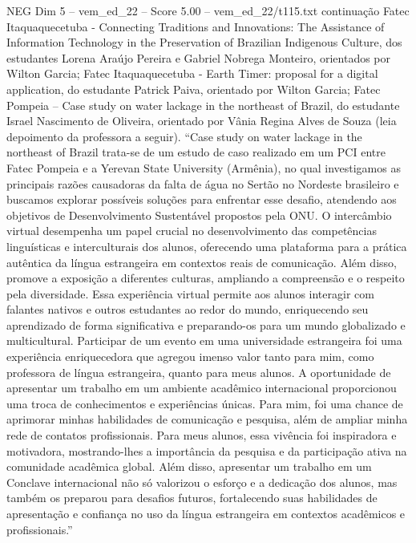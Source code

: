 \begin{textsample}{NEG Dim 5 – vem\_ed\_22 – Score 5.00 – vem\_ed\_22/t115.txt}  \label{ex:f5_neg_086}
continuação Fatec Itaquaquecetuba - Connecting Traditions and Innovations: The Assistance of Information Technology in the Preservation of Brazilian Indigenous Culture, dos estudantes Lorena Araújo Pereira e Gabriel Nobrega Monteiro, orientados por Wilton Garcia; Fatec Itaquaquecetuba - Earth Timer: proposal for a digital application, do estudante Patrick Paiva, orientado por Wilton Garcia; Fatec Pompeia – Case study on water lackage in the northeast of Brazil, do estudante Israel Nascimento de Oliveira, orientado por Vânia Regina Alves de Souza (leia depoimento da professora a seguir). “Case study on water lackage in the northeast of Brazil trata-se de um estudo de caso realizado em um PCI entre Fatec Pompeia e a Yerevan State University (Armênia), no qual investigamos as principais razões causadoras da falta de água no Sertão no Nordeste brasileiro e buscamos explorar possíveis soluções para enfrentar esse desafio, atendendo aos objetivos de Desenvolvimento Sustentável propostos pela ONU.
O intercâmbio virtual desempenha um papel crucial no desenvolvimento das competências linguísticas e interculturais dos alunos, oferecendo uma plataforma para a prática autêntica da língua estrangeira em contextos reais de comunicação.
Além disso, promove a exposição a diferentes culturas, ampliando a compreensão e o respeito pela diversidade.
Essa experiência virtual permite aos alunos interagir com falantes nativos e outros estudantes ao redor do mundo, enriquecendo seu aprendizado de forma significativa e preparando-os para um mundo globalizado e multicultural.
Participar de um evento em uma universidade estrangeira foi uma experiência enriquecedora que agregou imenso valor tanto para mim, como professora de língua estrangeira, quanto para meus alunos.
A oportunidade de apresentar um trabalho em um ambiente acadêmico internacional proporcionou uma troca de conhecimentos e experiências únicas.
Para mim, foi uma chance de aprimorar minhas habilidades de comunicação e pesquisa, além de ampliar minha rede de contatos profissionais.
Para meus alunos, essa vivência foi inspiradora e motivadora, mostrando-lhes a importância da pesquisa e da participação ativa na comunidade acadêmica global.
Além disso, apresentar um trabalho em um Conclave internacional não só valorizou o esforço e a dedicação dos alunos, mas também os preparou para desafios futuros, fortalecendo suas habilidades de apresentação e confiança no uso da língua estrangeira em contextos acadêmicos e profissionais.”

\end{textsample}
